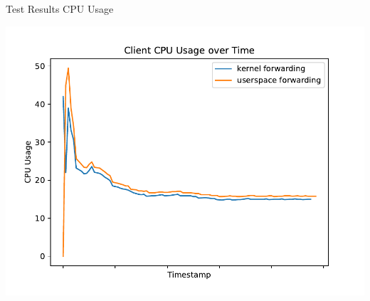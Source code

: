\documentclass[shortpres,aspectratio=43]{beamer}
\begin{document}
\begin{frame}{Test Results CPU Usage}
\begin{minipage}{0.58\textwidth}
        \includegraphics[scale=0.21]{../figures/04_testing_and_results/cpu_usage_client_ns.pdf}
    \end{minipage}
\end{frame}
\end{document}
